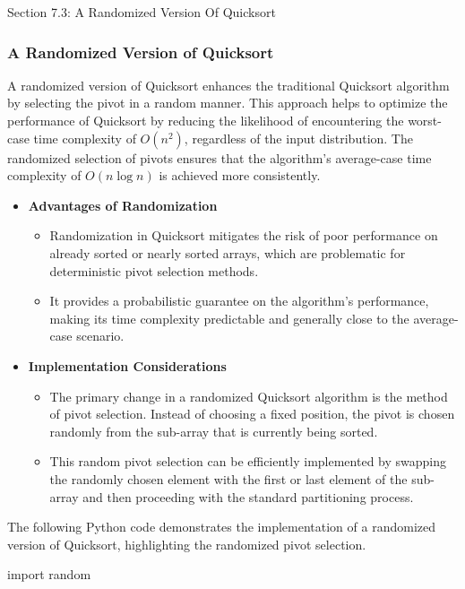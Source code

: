 \begin{notes}{Section 7.3: A Randomized Version Of Quicksort}
    \subsubsection*{A Randomized Version of Quicksort}

    A randomized version of Quicksort enhances the traditional Quicksort algorithm by selecting the pivot in a random manner. This approach helps to optimize the performance of Quicksort by reducing 
    the likelihood of encountering the worst-case time complexity of $O(n^2)$, regardless of the input distribution. The randomized selection of pivots ensures that the algorithm's average-case time 
    complexity of $O(n \log n)$ is achieved more consistently.
    
    \begin{itemize}
        \item \textbf{Advantages of Randomization}
        \begin{itemize}
            \item Randomization in Quicksort mitigates the risk of poor performance on already sorted or nearly sorted arrays, which are problematic for deterministic pivot selection methods.
            \item It provides a probabilistic guarantee on the algorithm's performance, making its time complexity predictable and generally close to the average-case scenario.
        \end{itemize}
        
        \item \textbf{Implementation Considerations}
        \begin{itemize}
            \item The primary change in a randomized Quicksort algorithm is the method of pivot selection. Instead of choosing a fixed position, the pivot is chosen randomly from the sub-array that 
            is currently being sorted.
            \item This random pivot selection can be efficiently implemented by swapping the randomly chosen element with the first or last element of the sub-array and then proceeding with the 
            standard partitioning process.
        \end{itemize}
    \end{itemize}
    
    \begin{highlight}
        The following Python code demonstrates the implementation of a randomized version of Quicksort, highlighting the randomized pivot selection.
    \begin{code}[Python]
    import random
    

\end{code}
\end{highlight}
\end{notes}

